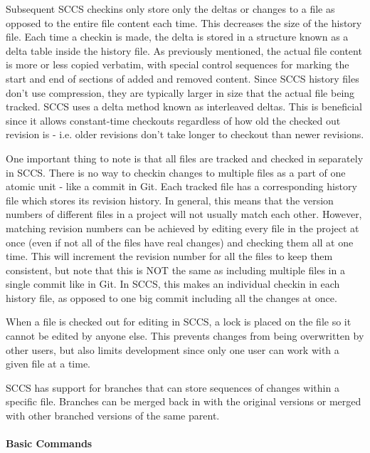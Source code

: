 Subsequent SCCS checkins only store only the deltas or changes to a file as opposed to the entire file content each time. This decreases the size of the history file. Each time a checkin is made, the delta is stored in a structure known as a delta table inside the history file. As previously mentioned, the actual file content is more or less copied verbatim, with special control sequences for marking the start and end of sections of added and removed content. Since SCCS history files don't use compression, they are typically larger in size that the actual file being tracked. SCCS uses a delta method known as interleaved deltas. This is beneficial since it allows constant-time checkouts regardless of how old the checked out revision is - i.e. older revisions don't take longer to checkout than newer revisions.

One important thing to note is that all files are tracked and checked in separately in SCCS. There is no way to checkin changes to multiple files as a part of one atomic unit - like a commit in Git. Each tracked file has a corresponding history file which stores its revision history. In general, this means that the version numbers of different files in a project will not usually match each other. However, matching revision numbers can be achieved by editing every file in the project at once (even if not all of the files have real changes) and checking them all at one time. This will increment the revision number for all the files to keep them consistent, but note that this is NOT the same as including multiple files in a single commit like in Git. In SCCS, this makes an individual checkin in each history file, as opposed to one big commit including all the changes at once.

When a file is checked out for editing in SCCS, a lock is placed on the file so it cannot be edited by anyone else. This prevents changes from being overwritten by other users, but also limits development since only one user can work with a given file at a time.

SCCS has support for branches that can store sequences of changes within a specific file. Branches can be merged back in with the original versions or merged with other branched versions of the same parent.

\paragraph{Basic Commands}

